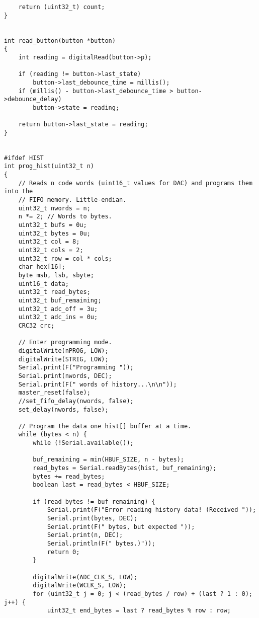 \documentclass[11pt,letterpaper]{article}
\begin{document}
\begin{verbatim}
    return (uint32_t) count;
}


int read_button(button *button)
{
    int reading = digitalRead(button->p);
    
    if (reading != button->last_state)
        button->last_debounce_time = millis();
    if (millis() - button->last_debounce_time > button->debounce_delay)
        button->state = reading;
    
    return button->last_state = reading;
}


#ifdef HIST
int prog_hist(uint32_t n)
{
    // Reads n code words (uint16_t values for DAC) and programs them into the
    // FIFO memory. Little-endian.
    uint32_t nwords = n;
    n *= 2; // Words to bytes.
    uint32_t bufs = 0u;
    uint32_t bytes = 0u;
    uint32_t col = 8;
    uint32_t cols = 2;
    uint32_t row = col * cols;
    char hex[16];
    byte msb, lsb, sbyte;
    uint16_t data;
    uint32_t read_bytes;
    uint32_t buf_remaining;
    uint32_t adc_off = 3u;
    uint32_t adc_ins = 0u;
    CRC32 crc;

    // Enter programming mode.
    digitalWrite(nPROG, LOW);
    digitalWrite(STRIG, LOW);
    Serial.print(F("Programming "));
    Serial.print(nwords, DEC);
    Serial.print(F(" words of history...\n\n"));
    master_reset(false);
    //set_fifo_delay(nwords, false);
    set_delay(nwords, false);

    // Program the data one hist[] buffer at a time.
    while (bytes < n) {
        while (!Serial.available());
        
        buf_remaining = min(HBUF_SIZE, n - bytes);
        read_bytes = Serial.readBytes(hist, buf_remaining);
        bytes += read_bytes;
        boolean last = read_bytes < HBUF_SIZE;
        
        if (read_bytes != buf_remaining) {
            Serial.print(F("Error reading history data! (Received "));
            Serial.print(bytes, DEC);
            Serial.print(F(" bytes, but expected "));
            Serial.print(n, DEC);
            Serial.println(F(" bytes.)"));
            return 0;
        }

        digitalWrite(ADC_CLK_S, LOW);
        digitalWrite(WCLK_S, LOW);
        for (uint32_t j = 0; j < (read_bytes / row) + (last ? 1 : 0); j++) {
            uint32_t end_bytes = last ? read_bytes % row : row;


\end{verbatim}
\end{document}
